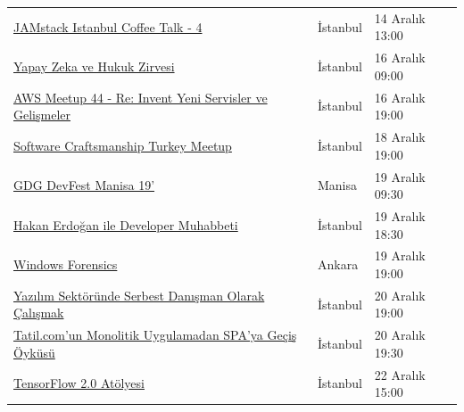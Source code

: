 \documentclass[11pt]{article}
\begin{document}
\begin{longtable}{|p{8cm}|l|l|}
\href{https://www.meetup.com/tr-TR/JAMstack/events/266280664/}{JAMstack Istanbul Coffee Talk - 4} & İstanbul & 14 Aralık 13:00\\
\href{https://www.eventbrite.com/e/yapay-zeka-ve-hukuk-zirvesi-tickets-84402900347}{Yapay Zeka ve Hukuk Zirvesi} & İstanbul & 16 Aralık 09:00\\
\href{https://www.meetup.com/tr-TR/AWS-User-Group-Turkey/events/266942291/}{AWS Meetup 44 - Re: Invent Yeni Servisler ve Gelişmeler} & İstanbul & 16 Aralık 19:00\\
\href{https://www.meetup.com/tr-TR/Software-Craftsmanship-Turkey/events/262170141/}{Software Craftsmanship Turkey Meetup} & İstanbul & 18 Aralık 19:00\\
\href{https://www.meetup.com/tr-TR/GDG-Manisa/events/266749804/}{GDG DevFest Manisa 19'} & Manisa & 19 Aralık 09:30\\
\href{https://www.eventbrite.com/e/hakan-erdogan-ile-developer-muhabbeti-facebook-devc-istanbul-tickets-85326589125}{Hakan Erdoğan ile Developer Muhabbeti} & İstanbul & 19 Aralık 18:30\\
\href{https://www.eventbrite.com/e/windows-forensics-hacknightsorg-tickets-78022654861}{Windows Forensics} & Ankara & 19 Aralık 19:00\\
\href{https://kommunity.com/devnot-yazilimci-bulusmalari/events/yazilim-sektorunde-serbest-danisman-olarak-calismak}{Yazılım Sektöründe Serbest Danışman Olarak Çalışmak} & İstanbul & 20 Aralık 19:00\\
\href{https://kommunity.com/frontend-istanbul/events/tatilcomun-monolotik-uygulamadan-spaya-gecis-oykusu}{Tatil.com’un Monolitik Uygulamadan SPA’ya Geçiş Öyküsü} & İstanbul & 20 Aralık 19:30\\
\href{https://www.meetup.com/tr-TR/istanbul-yapay-zeka-toplulugu/events/267007562/}{TensorFlow 2.0 Atölyesi} & İstanbul & 22 Aralık 15:00\\
\hline
\end{longtable}
\end{document}
